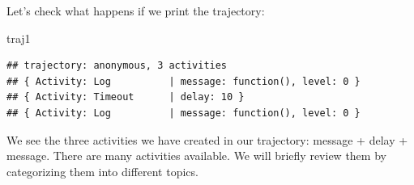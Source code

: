 \documentclass[
]{book}
\newenvironment{Shaded}{\begin{snugshade}}{\end{snugshade}}
\newcommand{\NormalTok}[1]{#1}
\begin{document}
Let's check what happens if we print the trajectory:

\begin{Shaded}
\begin{Highlighting}[]
\NormalTok{traj1}
\end{Highlighting}
\end{Shaded}

\begin{verbatim}
## trajectory: anonymous, 3 activities
## { Activity: Log          | message: function(), level: 0 }
## { Activity: Timeout      | delay: 10 }
## { Activity: Log          | message: function(), level: 0 }
\end{verbatim}

We see the three activities we have created in our trajectory: message + delay + message. There are many activities available. We will briefly review them by categorizing them into different topics.
\end{document}
